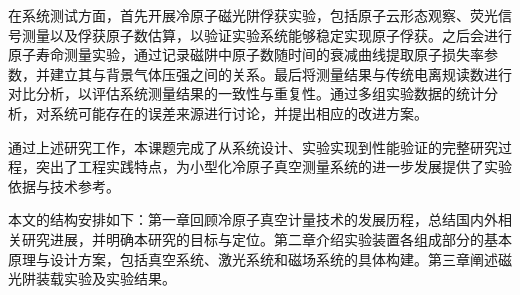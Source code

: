 在系统测试方面，首先开展冷原子磁光阱俘获实验，包括原子云形态观察、荧光信号测量以及俘获原子数估算，以验证实验系统能够稳定实现原子俘获。之后会进行原子寿命测量实验，通过记录磁阱中原子数随时间的衰减曲线提取原子损失率参数，并建立其与背景气体压强之间的关系。最后将测量结果与传统电离规读数进行对比分析，以评估系统测量结果的一致性与重复性。通过多组实验数据的统计分析，对系统可能存在的误差来源进行讨论，并提出相应的改进方案。

通过上述研究工作，本课题完成了从系统设计、实验实现到性能验证的完整研究过程，突出了工程实践特点，为小型化冷原子真空测量系统的进一步发展提供了实验依据与技术参考。

本文的结构安排如下：第一章回顾冷原子真空计量技术的发展历程，总结国内外相关研究进展，并明确本研究的目标与定位。第二章介绍实验装置各组成部分的基本原理与设计方案，包括真空系统、激光系统和磁场系统的具体构建。第三章阐述磁光阱装载实验及实验结果。


